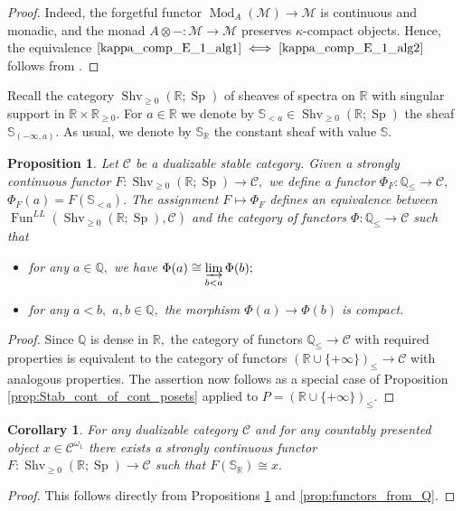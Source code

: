 \documentclass[11pt,leqno]{amsart}
\newcommand{\Iff}[2]{$\text{\ref{#1}}\iff\text{\ref{#2}}$}
\newtheorem{prop}[theo]{Proposition}
\newtheorem{cor}[theo]{Corollary}
\numberwithin{equation}{section}
\def\R{\mathbb{R}}
\def\bS{\mathbb{S}}
\def\Q{\mathbb{Q}}
\newcommand{\indlim}[1][]{\mathop{\varinjlim}\limits_{#1}}
\newcommand{\cM}{{\mathcal M}}
\newcommand{\cC}{{\mathcal C}}
\newcommand{\Fun}{\operatorname{Fun}}
\newcommand{\Sh}{\operatorname{Shv}}
\newcommand{\Sp}{\operatorname{Sp}}
\newcommand{\Mod}{\operatorname{Mod}}
\begin{document}
\begin{proof} Indeed, the forgetful functor $\Mod_A(\cM)\to\cM$ is continuous and monadic, and the monad $A\otimes-:\cM\to\cM$ preserves $\kappa$-compact objects. Hence, the equivalence \Iff{kappa_comp_E_1_alg1}{kappa_comp_E_1_alg2} follows from \cite[Lemma 6.17]{BSY}.\end{proof}

Recall the category $\Sh_{\geq 0}(\R;\Sp)$ of sheaves of spectra on $\R$ with singular support in $\R\times\R_{\geq 0}.$ For $a\in\R$ we denote by $\bS_{<a}\in \Sh_{\geq 0}(\R;\Sp)$ the sheaf $\bS_{(-\infty,a)}.$ As usual, we denote by $\bS_{\R}$ the constant sheaf with value $\bS.$

\begin{prop}\label{prop:functors_from_Sh_geq_0}Let $\cC$ be a dualizable stable category. Given a strongly continuous functor $F:\Sh_{\geq 0}(\R;\Sp)\to\cC,$ we define a functor $\Phi_F:\Q_{\leq}\to \cC,$ $\Phi_F(a)=F(\bS_{<a}).$ The assignment $F\mapsto\Phi_F$ defines an equivalence between $\Fun^{LL}(\Sh_{\geq 0}(\R;\Sp),\cC)$ and the category of functors $\Phi:\Q_{\leq}\to\cC$ such that
\begin{itemize}
\item for any $a\in\Q,$ we have $\Phi(a)\cong\indlim[b<a]\Phi(b);$

\item for any $a<b,$ $a,b\in\Q,$ the morphism $\Phi(a)\to\Phi(b)$ is compact.
\end{itemize}
\end{prop}

\begin{proof}Since $\Q$ is dense in $\R,$ the category of functors $\Q_{\leq}\to\cC$ with required properties is equivalent to the category of functors $(\R\cup\{+\infty\})_{\leq}\to\cC$ with analogous properties. The assertion now follows as a special case of Proposition \ref{prop:Stab_cont_of_cont_posets} applied to $P=(\R\cup\{+\infty\})_{\leq}.$\end{proof}

\begin{cor}\label{cor:many_functors_from_Sh_on_R} For any dualizable category $\cC$ and for any countably presented object $x\in\cC^{\omega_1}$ there exists a strongly continuous functor $F:\Sh_{\geq 0}(\R;\Sp)\to\cC$ such that $F(\bS_{\R})\cong x.$\end{cor}

\begin{proof}This follows directly from Propositions \ref{prop:functors_from_Sh_geq_0} and \ref{prop:functors_from_Q}.\end{proof}
\end{document}
